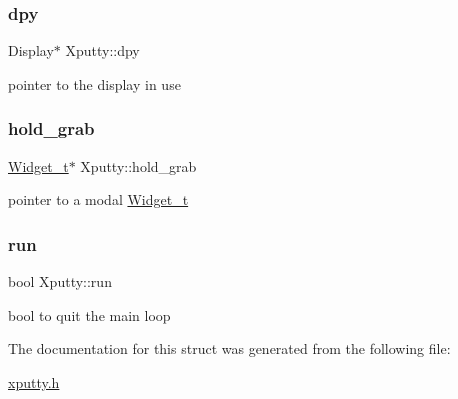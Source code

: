 \subsubsection{\texorpdfstring{dpy}{dpy}}
{\footnotesize\ttfamily Display$\ast$ Xputty\+::dpy}

pointer to the display in use \mbox{\label{structXputty_a744a6ffdff59d8725c863e7ecddfc0e1}} 
\subsubsection{\texorpdfstring{hold\+\_\+grab}{hold\_grab}}
{\footnotesize\ttfamily \hyperlink{structWidget__t}{Widget\+\_\+t}$\ast$ Xputty\+::hold\+\_\+grab}

pointer to a modal \hyperlink{structWidget__t}{Widget\+\_\+t} \mbox{\label{structXputty_a3a8e0381e77ae9fae69aab5dda8e7e7a}} 
\subsubsection{\texorpdfstring{run}{run}}
{\footnotesize\ttfamily bool Xputty\+::run}

bool to quit the main loop 

The documentation for this struct was generated from the following file\+:\begin{DoxyCompactItemize}
\item 
\hyperlink{xputty_8h}{xputty.\+h}\end{DoxyCompactItemize}
